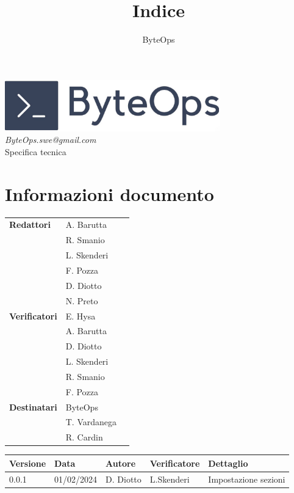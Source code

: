 \documentclass{article}
\title{\textbf{\fontsize{30}{6}\selectfont Indice}}
\author{\fontsize{14}{6}\selectfont ByteOps}
\date{}
\begin{document}
\pagestyle{fancy}
\begin{center}
    \includegraphics[width = 0.7\textwidth]{../Images/logo.png} \\
    \vspace{0.2cm}
    \textcolor[RGB]{60, 60, 60}{\textit{ByteOps.swe@gmail.com}} \\
    \vspace{1cm}
    \fontsize{16}{6}\selectfont Specifica tecnica \\
    \vspace{0.5cm}
\end{center}

\section*{Informazioni documento}
\def\arraystretch{1.2}
\begin{tabular}{>{\raggedleft\arraybackslash}p{}|>{\raggedright\arraybackslash}p{}c}
    \hline
    \addlinespace
    \textbf{Redattori}    & A. Barutta\\ & R. Smanio\\ & L. Skenderi\\ & F. Pozza\\ & D. Diotto \\ & N. Preto \vspace{10pt} \\
    \textbf{Verificatori} & E. Hysa\\ & A. Barutta\\ & D. Diotto\\ & L. Skenderi\\ & R. Smanio\\ & F. Pozza \vspace{10pt} \\
    \textbf{Destinatari}  & ByteOps\\ & T. Vardanega   \\ & R. Cardin \vspace{10pt} \\
\end{tabular}
\pagebreak

\begin{tabular}{|C{1.5cm}|C{2.1cm}|C{2cm}|C{2cm}|C{4.5cm}|}
    \hline 
    \textbf{Versione} & \textbf{Data} & \textbf{Autore} & \textbf{Verificatore} & \textbf{Dettaglio}            \\
    \hline
    \label{Git_Action_Version} 0.0.1 & 01/02/2024 & D. Diotto & L.Skenderi & Impostazione sezioni \\ 
    \hline 
\end{tabular}
\end{document}
